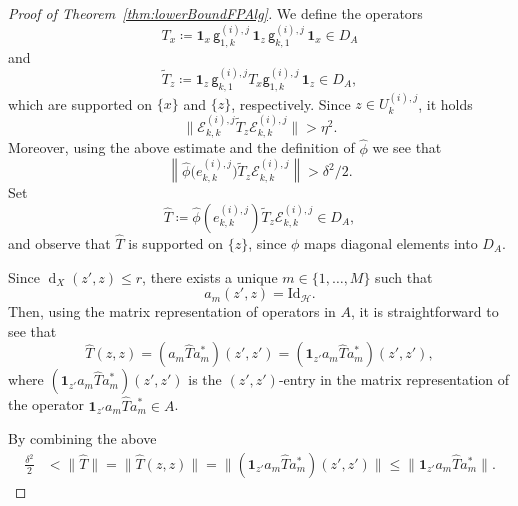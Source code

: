 \documentclass[10pt,a4paper]{amsart}
\newcommand{\Ecal}{\mathcal{E}}
\newcommand{\Hcal}{\mathcal{H}}
\DeclareMathOperator{\dist}{d}
\newcommand{\distX}[2]{{\dist_X ( #1, #2 )}}
\newcommand{\gUnMatImg}[3]{{ \mathsf{g}_{#3}^{(#1), #2}}}
\newcommand{\id}[1]{\mathrm{Id}_{#1}}
\newcommand{\indF}{\mathbf{1}}
\newcommand{\myhyp}{\textnormal{-}\hskip0pt\relax}
\newcommand{\norm}[1]{{\left\lVert #1 \right \rVert}}
\newcommand{\normBig}[1]{{\Big\lVert #1 \Big \rVert}}
\newcommand{\normbig}[1]{{\big\lVert #1 \big \rVert}}
\newcommand{\unMatImg}[3]{{\Ecal_{#3}^{(#1), #2}}}
\begin{document}
\begin{proof}[Proof of Theorem~\ref{thm:lowerBoundFPAlg}]
        We define the operators
        \begin{equation*}
            T_x \coloneq \indF_x \, \gUnMatImg{i}{j}{1,k} \, \indF_{z} \, \gUnMatImg{i}{j}{k,1} \, \indF_x \in D_A
        \end{equation*}
        and 
        \begin{equation*}
        \widetilde{T}_{z} \coloneq \indF_{z} \, \gUnMatImg{i}{j}{k,1} T_x \gUnMatImg{i}{j}{1,k} \, \indF_{z} \in D_A,
        \end{equation*}
        which are supported on $\{x\}$ and $\{z\}$, respectively.
        Since ${z \in U^{(i),j}_k}$, it holds
         \begin{equation*}
        \normbig{\unMatImg{i}{j}{k,k}  \widetilde{T}_{z} \unMatImg{i}{j}{k,k} }  > \eta^2.
    \end{equation*}
         Moreover, using the above estimate and the definition of ${\widehat{\phi}}$ we see that
        \begin{equation*}
            \norm{ \widehat{\phi}\Big(e_{k,k}^{(i),j} \Big)  \widetilde{T}_{z} \unMatImg{i}{j}{k,k}}  >  \delta^2/2.
        \end{equation*}
        Set 
       \begin{equation*}
           \widehat{T} \coloneq  \widehat{\phi}\left(e_{k,k}^{(i),j} \right)   \widetilde{T}_{z} \unMatImg{i}{j}{k,k} \in D_A,
       \end{equation*}
       and observe that $\widehat{T}$ is supported on $\{z\}$, 
       since $\phi$ maps diagonal elements into $D_A$.
        
        Since ${\distX{z'}{z} \le r}$, there exists a unique ${m \in \{1,\hdots,M\}}$ such that
     \[{a_m(z',z) = \id{\Hcal}}.\] 
        Then, using the matrix representation of operators in $A$, 
    it is straightforward to see that
    \begin{equation*}
                \widehat{T}(z,z) 
                = (a_m \widehat{T} a_m^\ast) (z',z') = (\indF_{z'} a_m \widehat{T} a_m^\ast) (z',z'),
    \end{equation*}
    where ${(\indF_{z'} a_m \widehat{T} a_m^\ast) (z',z')}$ is the ${(z',z')}$\myhyp{}entry in the matrix representation of the operator ${\indF_{z'} a_m \widehat{T} a_m^\ast\in A}$.

        By combining the above
        \begin{align*}
          \frac{\delta^2}{2}
          & <  \normBig{\widehat{T}} 
          = \normBig{\widehat{T}(z,z)}
          = \normBig{(\indF_{z'} a_m \widehat{T} a_m^\ast) (z',z')}
          \le \normBig{\indF_{z'} a_m \widehat{T} a_m^\ast }.
        \end{align*}


\end{proof}
\end{document}
